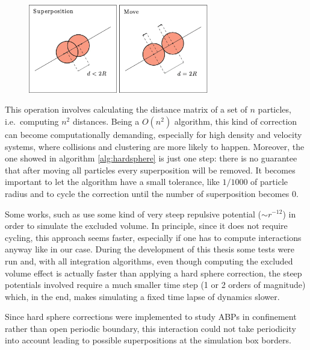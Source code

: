 \documentclass[../../master_thesis_np.tex]{subfiles}
\begin{document}
		\begin{figure}[htp]
			\centering
			\includegraphics[width = 0.7\textwidth]{callegari_volpe_2019_hardsphere.png}
			\label{fig:hardsphere}
			\caption{ \cite{callegari_numerical_2019}}
		\end{figure}

	This operation involves calculating the distance matrix of a set of $n$ particles, i.e.~computing $n^2$ distances. Being a $O(n^2)$ algorithm, this kind of correction can become computationally demanding, especially for high density and velocity systems, where collisions and clustering are more likely to happen. Moreover, the one showed in algorithm \ref{alg:hardsphere} is just one step: there is no guarantee that after moving all particles every superposition will be removed. It becomes important to let the algorithm have a small tolerance, like $1/1000$ of particle radius and to cycle the correction until the number of superposition becomes $0$.
	
	Some works, such as \cite{martin-gomez_collective_2018, caprini_spontaneous_2020} use some kind of very steep repulsive potential ($\sim r^{-12}$) in order to simulate the excluded volume. In principle, since it does not require cycling, this approach seems faster, especially if one has to compute interactions anyway like in our case. During the development of this thesis some tests were run and, with all integration algorithms, even though computing the excluded volume effect is actually faster than applying a hard sphere correction, the steep potentials involved require a much smaller time step (1 or 2 orders of magnitude) which, in the end, makes simulating a fixed time lapse of dynamics slower.
	
	Since hard sphere corrections were implemented to study ABPs in confinement rather than open periodic boundary, this interaction could not take periodicity into account leading to possible superpositions at the simulation box borders.
	
\end{document}
